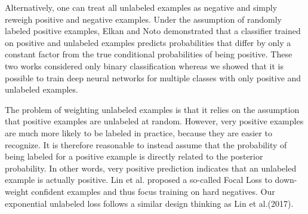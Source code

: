 Alternatively, one can treat all unlabeled examples as negative and simply reweigh positive and negative examples\cite{lee2003learning}.
Under the assumption of randomly labeled positive examples, Elkan and Noto\cite{elkan2008learning} demonstrated that a classifier trained on positive and unlabeled examples predicts probabilities that differ by only a constant factor from the true conditional probabilities of being positive.
These two works considered only binary classification whereas we showed that it is possible to train deep neural networks for multiple classes with only positive and unlabeled examples.

The problem of weighting unlabeled examples is that it relies on the assumption that positive examples are unlabeled at random.
However, very positive examples are much more likely to be labeled in practice, because they are easier to recognize.
It is therefore reasonable to instead assume that the probability of being labeled for a positive example is directly related to the posterior probability.\cite{tax2016class}
In other words, very positive prediction indicates that an unlabeled example is actually positive.
Lin et al. \cite{lin2017focal} proposed a so-called Focal Loss to down-weight confident examples and thus focus training on hard negatives.
Our exponential unlabeled loss follows a similar design thinking as Lin et al.(2017).

